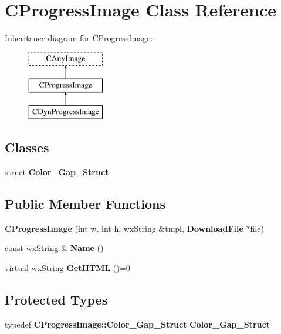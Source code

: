 \section{CProgressImage Class Reference}
\label{classCProgressImage}
Inheritance diagram for CProgressImage::\begin{figure}[H]
\begin{center}
\leavevmode
\includegraphics[height=3cm]{classCProgressImage}
\end{center}
\end{figure}
\subsection*{Classes}
\begin{DoxyCompactItemize}
\item 
struct {\bf Color\_\-Gap\_\-Struct}
\end{DoxyCompactItemize}
\subsection*{Public Member Functions}
\begin{DoxyCompactItemize}
\item 
{\bfseries CProgressImage} (int w, int h, wxString \&tmpl, {\bf DownloadFile} $\ast$file)\label{classCProgressImage_a7746a1af48adf8328b99f6dd4a2baadb}

\item 
const wxString \& {\bfseries Name} ()\label{classCProgressImage_a8e2cde02c0a2a0b7e54eb60aed95286c}

\item 
virtual wxString {\bfseries GetHTML} ()=0\label{classCProgressImage_afbb600049f92c1fb214b617988bab68b}

\end{DoxyCompactItemize}
\subsection*{Protected Types}
\begin{DoxyCompactItemize}
\item 
typedef {\bf CProgressImage::Color\_\-Gap\_\-Struct} {\bfseries Color\_\-Gap\_\-Struct}\label{classCProgressImage_a2aecb1d211c2f5cfedf7052e233fe834}

\end{DoxyCompactItemize}
